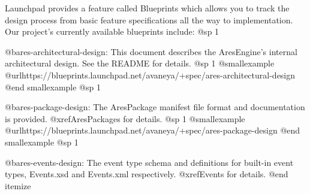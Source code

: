 Launchpad provides a feature called Blueprints which allows you to track the design process from basic feature specifications all the way to implementation. Our project's currently available blueprints include:
@sp 1

\itemize
\item
@b{ares-architectural-design}: This document describes the AresEngine's internal architectural design. See the README for details.
@sp 1
@smallexample
@url{https://blueprints.launchpad.net/avaneya/+spec/ares-architectural-design}
@end smallexample
@sp 1

\item
@b{ares-package-design}: The AresPackage manifest file format and documentation is provided. @xref{AresPackages} for details.
@sp 1
@smallexample
@url{https://blueprints.launchpad.net/avaneya/+spec/ares-package-design}
@end smallexample
@sp 1

\item
@b{ares-events-design}: The event type schema and definitions for built-in event types, Events.xsd and Events.xml respectively. @xref{Events} for details.
@end itemize


